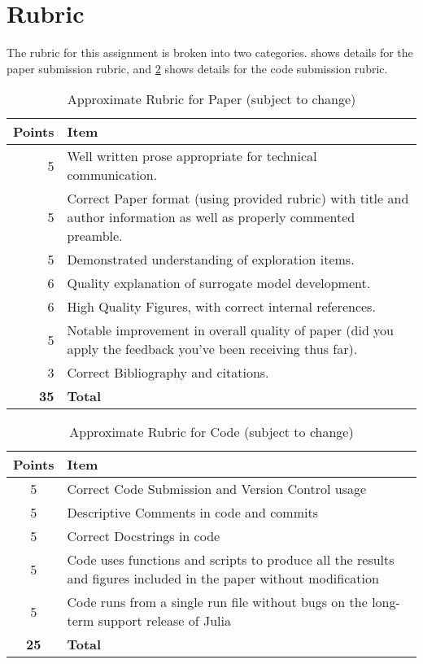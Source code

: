 \documentclass[12pt]{article}
\begin{document}
\section{Rubric}

The rubric for this assignment is broken into two categories. 
 shows details for the paper submission rubric, and
\cref{tab:coderubric} shows details for the code submission rubric.

\begin{table}[h!]
	\caption{Approximate Rubric for Paper (subject to change)}
	\label{tab:paperrubric}
	\renewcommand{\arraystretch}{1.2}
	\vspace{1em}
	\begin{tabular}{r|p{5in}}
		\textbf{Points} & \textbf{Item} \\ 
		\hline
		5 & Well written prose appropriate for technical communication. \\
		5 & Correct Paper format (using provided rubric) with title and author information as well as properly commented preamble. \\
		5 & Demonstrated understanding of exploration items. \\
		6 & Quality explanation of surrogate model development. \\
		6 & High Quality Figures, with correct internal references. \\
		5 & Notable improvement in overall quality of paper (did you apply the feedback you've been receiving thus far). \\
		3 & Correct Bibliography and citations. \\
		\textbf{35} & \textbf{Total}
	\end{tabular}
\end{table}

\begin{table}[h!]
	\caption{Approximate Rubric for Code (subject to change)}
	\label{tab:coderubric}
	\renewcommand{\arraystretch}{1.2}
	\vspace{1em}
	\begin{tabular}{c|p{5in}}
		\textbf{Points} & \textbf{Item} \\ 
		\hline
		5 & Correct Code Submission and Version Control usage\\
		5 & Descriptive Comments in code and commits \\
		5 & Correct Docstrings in code\\
		5 & Code uses functions and scripts to produce all the results and figures included in the paper without modification \\
		5 & Code runs from a single run file without bugs on the long-term support release of Julia\\
		\textbf{25} & \textbf{Total}
	\end{tabular}
\end{table}
\end{document}
